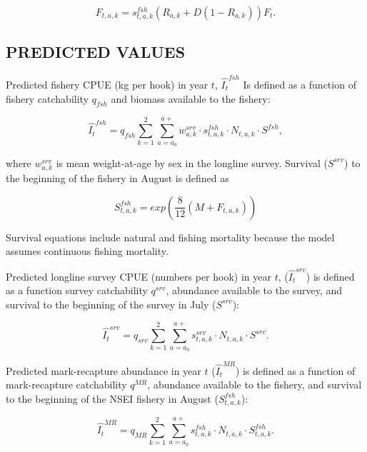 \documentclass[
]{article}
\begin{document}
\[
\begin{equation}
F_{t,a,k}=s_{t,a,k}^{fsh}(R_{a,k}+D(1-R_{a,k}))F_t.
\label{eq:fmort2}
\end{equation}
\]

\hypertarget{predicted-values}{%
\subsection{PREDICTED VALUES}\label{predicted-values}}

Predicted fishery CPUE (kg per hook) in year \(t\), \(\hat{I_t}^{fsh}\) Is defined as a function of fishery catchability \(q_{fsh}\) and biomass available to the fishery:

\[
\begin{equation}
\hat{I_t}^{fsh}=q_{fsh}\sum_{k=1}^{2}\sum_{a=a_0}^{a+}w_{a,k}^{srv} \cdot s_{t,a,k}^{fsh} \cdot N_{t,a,k} \cdot S^{fsh},
\label{eq:predfshcpue}
\end{equation}
\]

where \(w_{a,k}^{srv}\) is mean weight-at-age by sex in the longline survey. Survival (\(S^{srv}\)) to the beginning of the fishery in August is defined as

\[
\begin{equation}
S_{t,a,k}^{fsh}=exp(\frac{8}{12}(M+F_{t,a,k}))
\label{eq:bigS}
\end{equation}
\]

Survival equations include natural and fishing mortality because the model assumes continuous fishing mortality.

Predicted longline survey CPUE (numbers per hook) in year \(t\), (\(\hat{I_t}^{srv}\)) is defined as a function survey catchability \(q^{srv}\), abundance available to the survey, and survival to the beginning of the survey in July (\(S^{srv}\)):

\[
\begin{equation}
\hat{I_t}^{srv}=q_{srv}\sum_{k=1}^{2}\sum_{a=a_0}^{a+}s_{t,a,k}^{srv} \cdot N_{t,a,k} \cdot S^{srv}.
\label{eq:predsrvcpue}
\end{equation}
\]

Predicted mark-recapture abundance in year \(t\) (\(\hat{I_t}^{MR}\)) is defined as a function of mark-recapture catchability \(q^{MR}\), abundance available to the fishery, and survival to the beginning of the NSEI fishery in August (\(S_{t,a,k}^{fsh}\)):

\[
\begin{equation}
\hat{I_t}^{MR}=q_{MR}\sum_{k=1}^{2}\sum_{a=a_0}^{a+}s_{t,a,k}^{fsh} \cdot N_{t,a,k} \cdot S_{t,a,k}^{fsh}.
\label{eq:predmr}
\end{equation}
\]
\end{document}
